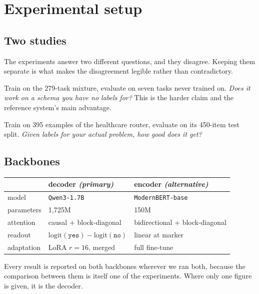 \section{Experimental setup}
\label{sec:experiments}

\subsection{Two studies}

The experiments answer two different questions, and they disagree. Keeping
them separate is what makes the disagreement legible rather than
contradictory.

\begin{description}[leftmargin=0em,itemsep=0.35em]
  \item[Study G (general capability).] Train on the 279-task mixture,
    evaluate on seven tasks never trained on. \emph{Does it work on a
    schema you have no labels for?} This is the harder claim and the
    reference system's main advantage.
  \item[Study S (specific use case).] Train on 395 examples of the
    healthcare router, evaluate on its 450-item test split. \emph{Given
    labels for your actual problem, how good does it get?}
\end{description}

\subsection{Backbones}

\begin{center}
\begin{tabular}{lll}
\toprule
 & decoder \emph{(primary)} & encoder \emph{(alternative)} \\
\midrule
model & \texttt{Qwen3-1.7B} & \texttt{ModernBERT-base} \\
parameters & 1{,}725M & 150M \\
attention & causal + block-diagonal & bidirectional + block-diagonal \\
readout & $\text{logit}(\texttt{yes}) - \text{logit}(\texttt{no})$ & linear at marker \\
adaptation & LoRA $r{=}16$, merged & full fine-tune \\
\bottomrule
\end{tabular}
\end{center}

Every result is reported on both backbones wherever we ran both, because
the comparison between them is itself one of the experiments. Where only
one figure is given, it is the decoder.


